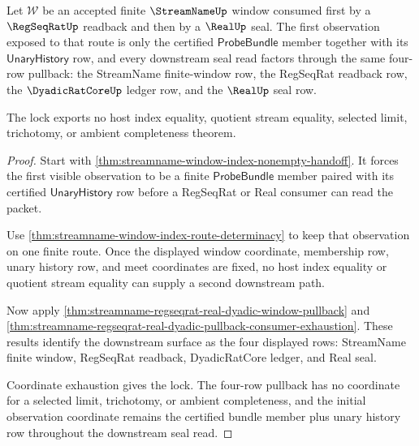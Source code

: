 \begin{theorem}
\label{thm:streamname-real-regseq-observation-pullback-lock}
Let $\mathcal W$ be an accepted finite $\StreamNameUp$ window consumed first
by a $\RegSeqRatUp$ readback and then by a $\RealUp$ seal. The first
observation exposed to that route is only the certified
$\mathsf{ProbeBundle}$ member together with its
$\mathsf{UnaryHistory}$ row, and every downstream seal read factors through
the same four-row pullback: the StreamName finite-window row, the RegSeqRat
readback row, the $\DyadicRatCoreUp$ ledger row, and the $\RealUp$ seal row.

The lock exports no host index equality, quotient stream equality, selected
limit, trichotomy, or ambient completeness theorem.
\end{theorem}
\begin{proof}
Start with \autoref{thm:streamname-window-index-nonempty-handoff}. It forces
the first visible observation to be a finite $\mathsf{ProbeBundle}$ member
paired with its certified $\mathsf{UnaryHistory}$ row before a RegSeqRat or
Real consumer can read the packet.

Use \autoref{thm:streamname-window-index-route-determinacy} to keep that
observation on one finite route. Once the displayed window coordinate,
membership row, unary history row, and meet coordinates are fixed, no host
index equality or quotient stream equality can supply a second downstream
path.

Now apply
\autoref{thm:streamname-regseqrat-real-dyadic-window-pullback} and
\autoref{thm:streamname-regseqrat-real-dyadic-pullback-consumer-exhaustion}.
These results identify the downstream surface as the four displayed rows:
StreamName finite window, RegSeqRat readback, DyadicRatCore ledger, and Real
seal.

Coordinate exhaustion gives the lock. The four-row pullback has no coordinate
for a selected limit, trichotomy, or ambient completeness, and the initial
observation coordinate remains the certified bundle member plus unary history
row throughout the downstream seal read.
\end{proof}


